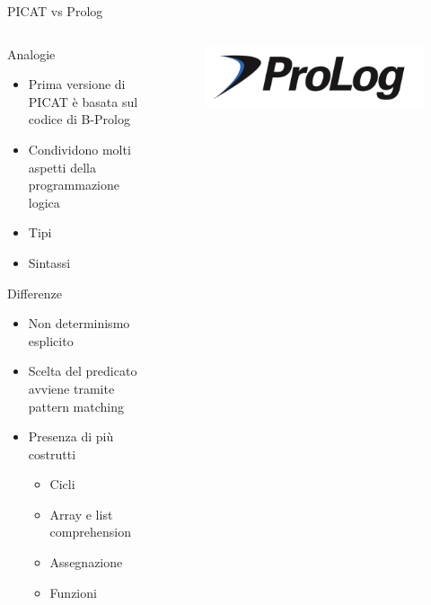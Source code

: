 \begin{frame}[fragile]{PICAT vs Prolog}

	\begin{columns}

		\begin{column}{1\textwidth}
			Analogie
			\begin{itemize}
				\item Prima versione di PICAT è basata sul codice di B-Prolog
				\item Condividono molti aspetti della programmazione logica
				\item Tipi
				\item Sintassi
			\end{itemize}

			Differenze
			\begin{itemize}
				\item Non determinismo esplicito
				\item Scelta del predicato avviene tramite pattern matching
				\item Presenza di più costrutti
					\begin{itemize}
						\item Cicli
						\item Array e list comprehension
						\item Assegnazione
						\item Funzioni
					\end{itemize}
			\end{itemize}

		\end{column}

		\begin{column}{0.1\textwidth}
			\begin{figure}
				\vspace*{4cm}
				\hspace*{-3.5cm}
				\includegraphics[scale=0.2]{res/prologLogo}
			\end{figure}
		\end{column}

	\end{columns}

\end{frame}

